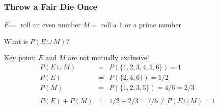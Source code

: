 \documentclass{beamer}
\begin{document}
\begin{frame}
\frametitle{Throw a Fair Die Once}
\begin{block}{$E = $ roll an even number \hfill $M = $ roll a 1 or a prime number}
\end{block}
\begin{alertblock}{What is $P(E\cup M)$?}\end{alertblock}
\pause
Key point: $E$ and $M$ are not mutually exclusive! 
	\begin{eqnarray*}
		P(E\cup M) &=& P(\{1,2,3,4,5,6\})= 1\\ 
		P(E) &=& P(\{2,4,6\}) = 1/2\\ 
		P(M) &=& P(\{1,2,3,5\}) = 4/6 = 2/3\\ \\
		P(E) + P(M) &=& 1/2 + 2/3 = 7/6 \neq P(E\cup M) = 1
	\end{eqnarray*}

\end{frame}
\end{document}
